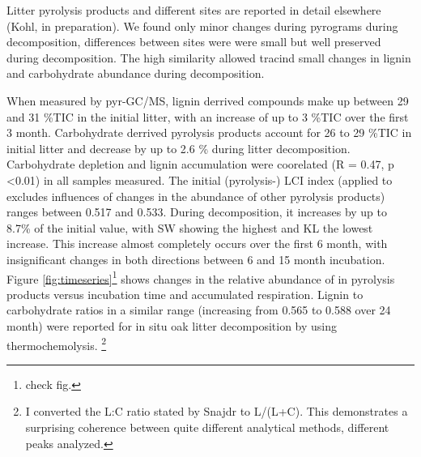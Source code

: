 \documentclass[authoryear,preprint,review,12pt]{elsarticle}
\begin{document}
Litter pyrolysis products and different sites are reported in detail elsewhere (Kohl, in preparation). We found only minor changes during pyrograms during decomposition, differences between sites were were small but well preserved during decomposition. The high similarity allowed tracind small changes in lignin and carbohydrate abundance during decomposition. %

When measured by pyr-GC/MS, lignin derrived compounds make up between 29 and 31 \%TIC in the initial litter, with an increase of up to 3 \%TIC over the first 3 month. Carbohydrate derrived pyrolysis products account for 26 to 29 \%TIC in initial litter and decrease by up to 2.6 \% during litter decomposition. Carbohydrate depletion and lignin accumulation were coorelated (R = 0.47, p \textless 0.01) in all samples measured. The initial (pyrolysis-) LCI index (applied to excludes influences of changes in the abundance of other pyrolysis products) ranges between 0.517 and 0.533. During decomposition, it increases by up to 8.7\% of the initial value, with SW showing the highest and KL the lowest increase. This increase almost completely occurs over the first 6 month, with insignificant changes in both directions between 6 and 15 month incubation. Figure \ref{fig:timeseries}\footnote{check fig.} shows changes in the relative abundance of in pyrolysis products versus incubation time and accumulated respiration. Lignin to carbohydrate ratios in a similar range (increasing from 0.565 to 0.588 over 24 month) were reported for in situ oak litter decomposition by \cite{Snajdr2010} using thermochemolysis. \footnote{I converted the L:C ratio stated by Snajdr to L/(L+C). This demonstrates a surprising coherence between quite different analytical methods, different peaks analyzed.}


\end{document}
